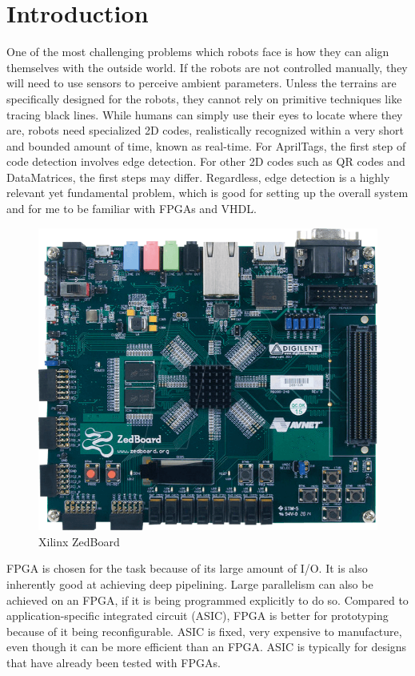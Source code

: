\documentclass{IEEEtran}
\begin{document}
	\section{Introduction}
	One of the most challenging problems which robots face is how they can align themselves with the outside world. If the robots are not controlled manually, they will need to use sensors to perceive ambient parameters. Unless the terrains are specifically designed for the robots, they cannot rely on primitive techniques like tracing black lines. While humans can simply use their eyes to locate where they are, robots need specialized 2D codes, realistically recognized within a very short and bounded amount of time, known as real-time. For AprilTags, the first step of code detection involves edge detection. For other 2D codes such as QR codes and DataMatrices, the first steps may differ. Regardless, edge detection is a highly relevant yet fundamental problem, which is good for setting up the overall system and for me to be familiar with FPGAs and VHDL.
	\begin{figure}[h]
		\centering
		\includegraphics[scale=0.33]{zedboard}
		\caption{Xilinx ZedBoard}
		\label{fig:zedboard}
	\end{figure}
	FPGA is chosen for the task because of its large amount of I/O. It is also inherently good at achieving deep pipelining. Large parallelism can also be achieved on an FPGA, if it is being programmed explicitly to do so. Compared to application-specific integrated circuit (ASIC), FPGA is better for prototyping because of it being reconfigurable. ASIC is fixed, very expensive to manufacture, even though it can be more efficient than an FPGA. ASIC is typically for designs that have already been tested with FPGAs.
	
\end{document}
